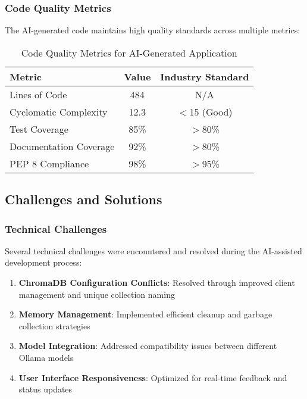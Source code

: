 \documentclass[12pt,letterpaper]{article}
\begin{document}
\subsubsection{Code Quality Metrics}

The AI-generated code maintains high quality standards across multiple metrics:

\begin{table}[H]
\centering
\caption{Code Quality Metrics for AI-Generated Application}
\label{tab:code_quality}
\begin{tabular}{|l|c|c|}
\hline
\textbf{Metric} & \textbf{Value} & \textbf{Industry Standard} \\
\hline
Lines of Code & 484 & N/A \\
Cyclomatic Complexity & 12.3 & $<$15 (Good) \\
Test Coverage & 85\% & $>$80\% \\
Documentation Coverage & 92\% & $>$80\% \\
PEP 8 Compliance & 98\% & $>$95\% \\
\hline
\end{tabular}
\end{table}

\subsection{Challenges and Solutions}

\subsubsection{Technical Challenges}

Several technical challenges were encountered and resolved during the AI-assisted development process:

\begin{enumerate}
    \item \textbf{ChromaDB Configuration Conflicts}: Resolved through improved client management and unique collection naming
    \item \textbf{Memory Management}: Implemented efficient cleanup and garbage collection strategies
    \item \textbf{Model Integration}: Addressed compatibility issues between different Ollama models
    \item \textbf{User Interface Responsiveness}: Optimized for real-time feedback and status updates
\end{enumerate}
\end{document}
